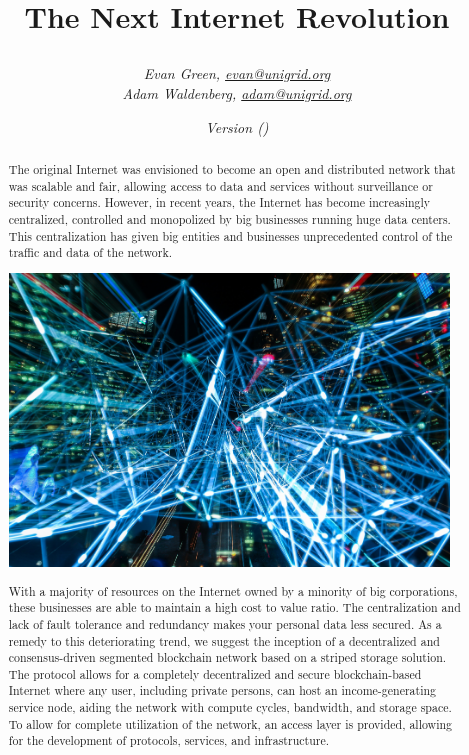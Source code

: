 \documentclass[a4paper,oneside]{article}
\author{\textit{Evan Green, \href{mailto:evan@unigrid.org}{evan@unigrid.org}}\\
\textit{Adam Waldenberg, \href{mailto:adam@unigrid.org}{adam@unigrid.org}}}
\affil{The Unigrid Foundation}
\title{
	\makebox[\textwidth]{\hspace{600pt}\tikz \fill[orange] (18,1.4) rectangle (0,0);}
	\vspace{60pt}
	\begin{center}
		
	\end{center}
	\vspace{35pt}
	\textbf{The Next Internet Revolution}
	\vspace{10pt}
}
\date{\emph{Version \gitRel\hspace{5pt}(\gitCommitterDate)}}
\begin{document}
\clearpage\maketitle
\thispagestyle{empty}
\newpage
\vspace*{+34pt}
\begin{abstract}
\noindent The original Internet was envisioned to become an open and distributed network that was scalable and fair, allowing access to data and services without surveillance or security concerns. However, in recent years, the Internet has become increasingly centralized, controlled and monopolized by big businesses running huge data centers. This centralization has given big entities and businesses unprecedented control of the traffic and data of the network.

\vspace{0.1cm}
\begin{mdframed}[style=textimage]
	\includegraphics[width=331pt]{lights}
\end{mdframed}

\noindent With a majority of resources on the Internet owned by a minority of big corporations, these businesses are able to maintain a high cost to value ratio. The centralization and lack of fault tolerance and redundancy makes your personal data less secured. As a remedy to this deteriorating trend, we suggest the inception of a decentralized and consensus-driven segmented blockchain network based on a striped storage solution. The protocol allows for a completely decentralized and secure blockchain-based Internet where any user, including private persons, can host an income-generating service node, aiding the network with compute cycles, bandwidth, and storage space. To allow for complete utilization of the network, an access layer is provided, allowing for the development of protocols, services, and infrastructure.
\vspace*{+40pt}
\end{abstract}
\end{document}
